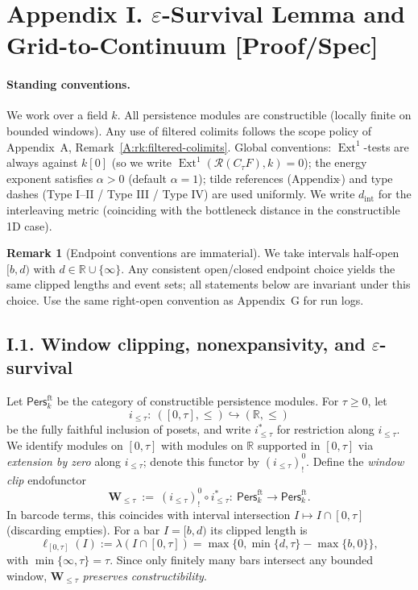 \documentclass[11pt]{article}
\DeclareMathOperator{\Ext}{Ext}
\newcommand{\Pers}{\mathsf{Pers}}
\numberwithin{equation}{section}
\theoremstyle{definition}
\newtheorem{remark}[theorem]{Remark}
\begin{document}
\section*{Appendix I. $\varepsilon$-Survival Lemma and Grid-to-Continuum [Proof/Spec]}
{}
\label{I:eps-survival}

\paragraph{Standing conventions.}
We work over a field \(k\). All persistence modules are constructible (locally finite on bounded windows). Any use of filtered colimits follows the scope policy of Appendix~A, Remark~\ref{A:rk:filtered-colimits}. Global conventions: \(\Ext^1\)-tests are always against \(k[0]\) (so we write \(\Ext^1(\mathcal{R}(C_\tau F),k)=0\)); the energy exponent satisfies \(\alpha>0\) (default \(\alpha=1\)); tilde references (\(\text{Appendix}\,\tilde{}\)) and type dashes (Type I--II / Type III / Type IV) are used uniformly. We write \(d_{\mathrm{int}}\) for the interleaving metric (coinciding with the bottleneck distance in the constructible 1D case).

\begin{remark}[Endpoint conventions are immaterial]\label{I:rk:endpoints}
We take intervals half-open \([b,d)\) with \(d\in\mathbb{R}\cup\{\infty\}\). Any consistent open/closed endpoint choice yields the same clipped lengths and event sets; all statements below are invariant under this choice. Use the same right-open convention as Appendix~G for run logs.
\end{remark}

\subsection*{I.1. Window clipping, nonexpansivity, and $\varepsilon$-survival}
Let \(\Pers^{\mathrm{ft}}_k\) be the category of constructible persistence modules. For \(\tau\ge 0\), let
\[
i_{\le\tau}:\ ([0,\tau],\le)\hookrightarrow(\mathbb{R},\le)
\]
be the fully faithful inclusion of posets, and write \(i_{\le\tau}^{\ast}\) for restriction along \(i_{\le\tau}\).
We identify modules on \([0,\tau]\) with modules on \(\mathbb{R}\) supported in \([0,\tau]\) via \emph{extension by zero} along \(i_{\le\tau}\); denote this functor by \((i_{\le\tau})^{0}_!\).
Define the \emph{window clip} endofunctor
\[
\mathbf{W}_{\le \tau}\ :=\ (i_{\le\tau})^{0}_!\circ i_{\le\tau}^{\ast}:\ \Pers^{\mathrm{ft}}_k\longrightarrow \Pers^{\mathrm{ft}}_k.
\]
In barcode terms, this coincides with interval intersection \(I\mapsto I\cap[0,\tau]\) (discarding empties). For a bar \(I=[b,d)\) its clipped length is
\[
\ell_{[0,\tau]}(I):=\lambda\!\left(I\cap[0,\tau]\right)=\max\{0,\min\{d,\tau\}-\max\{b,0\}\},
\]
with \(\min\{\infty,\tau\}=\tau\). Since only finitely many bars intersect any bounded window, \(\mathbf{W}_{\le\tau}\) \emph{preserves constructibility}.
\end{document}
